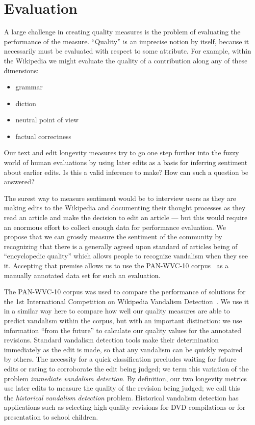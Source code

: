 \section{Evaluation}

A large challenge in creating quality measures is the
problem of evaluating the performance of the measure.
``Quality'' is an imprecise notion by itself, because it
necessarily must be evaluated with respect to some attribute.
For example, within the Wikipedia we might evaluate the quality
of a contribution along any of these dimensions:
\begin{itemize}
\item grammar
\item diction
\item neutral point of view
\item factual correctness
\end{itemize}
Our text and edit longevity measures try to go one step
further into the fuzzy world of human evaluations by using
later edits as a basis for inferring sentiment about earlier edits.
Is this a valid inference to make?
How can such a question be answered?

The surest way to measure sentiment would be to interview
users as they are making edits to the Wikipedia and documenting
their thought processes as they read an article and make the
decision to edit an article --- but this would require an enormous
effort to collect enough data for performance evaluation.
We propose that we can grossly measure the sentiment of the
community by recognizing that there is a generally agreed upon
standard of articles being of ``encyclopedic quality''
which allows people to recognize vandalism when they see it.
Accepting that premise allows us to use the PAN-WVC-10
corpus~\cite{Potthast2010a} as a manually annotated data set for
such an evaluation.

The PAN-WVC-10 corpus was used to compare the performance of
solutions for the 1st International Competition on Wikipedia
Vandalism Detection~\cite{Potthast2010b}.
We use it in a similar way here to compare how well our quality
measures are able to predict vandalism within the corpus,
but with an important distinction:
we use information ``from the future'' to calculate our
quality values for the annotated revisions.
Standard vandalism detection tools make their determination
immediately as the edit is made, so that any vandalism can be
quickly repaired by others.
The necessity for a quick classification precludes waiting
for future edits or rating to corroborate the edit being judged;
we term this variation of the problem \textit{immediate vandalism detection}.
By definition, our two longevity metrics use later edits to
measure the quality of the revision being judged; we call
this the \textit{historical vandalism detection} problem.
Historical vandalism detection has applications such as selecting
high quality revisions for DVD compilations or for presentation
to school children.

